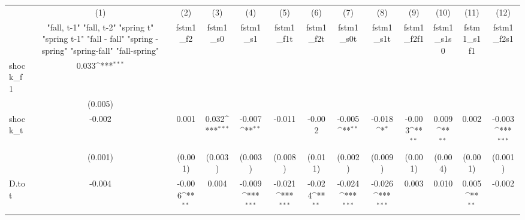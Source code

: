 {
\def\sym#1{\ifmmode^{#1}\else\(^{#1}\)\fi}
\begin{tabular}{l*{12}{c}}
\toprule
            &\multicolumn{1}{c}{(1)}&\multicolumn{1}{c}{(2)}&\multicolumn{1}{c}{(3)}&\multicolumn{1}{c}{(4)}&\multicolumn{1}{c}{(5)}&\multicolumn{1}{c}{(6)}&\multicolumn{1}{c}{(7)}&\multicolumn{1}{c}{(8)}&\multicolumn{1}{c}{(9)}&\multicolumn{1}{c}{(10)}&\multicolumn{1}{c}{(11)}&\multicolumn{1}{c}{(12)}\\
            &\multicolumn{1}{c}{  "fall, t-1" "fall, t-2" "spring t" "spring t-1"  "fall - fall" "spring - spring" "spring-fall" "fall-spring" }&\multicolumn{1}{c}{fstm1\_f2}&\multicolumn{1}{c}{fstm1\_s0}&\multicolumn{1}{c}{fstm1\_s1}&\multicolumn{1}{c}{fstm1\_f1t}&\multicolumn{1}{c}{fstm1\_f2t}&\multicolumn{1}{c}{fstm1\_s0t}&\multicolumn{1}{c}{fstm1\_s1t}&\multicolumn{1}{c}{fstm1\_f2f1}&\multicolumn{1}{c}{fstm1\_s1s0}&\multicolumn{1}{c}{fstm1\_s1f1}&\multicolumn{1}{c}{fstm1\_f2s1}\\
\midrule
shock\_f1    &       0.033\sym{***}&                     &                     &                     &                     &                     &                     &                     &                     &                     &                     &                     \\
            &     (0.005)         &                     &                     &                     &                     &                     &                     &                     &                     &                     &                     &                     \\
\addlinespace
shock\_t     &      -0.002         &       0.001         &       0.032\sym{***}&      -0.007\sym{**} &      -0.011         &      -0.002         &      -0.005\sym{**} &      -0.018\sym{*}  &      -0.003\sym{**} &       0.009\sym{**} &       0.002         &      -0.003\sym{***}\\
            &     (0.001)         &     (0.001)         &     (0.003)         &     (0.003)         &     (0.008)         &     (0.011)         &     (0.002)         &     (0.009)         &     (0.001)         &     (0.004)         &     (0.001)         &     (0.001)         \\
\addlinespace
D.tot       &      -0.004         &      -0.006\sym{**} &       0.004         &      -0.009\sym{***}&      -0.021\sym{***}&      -0.024\sym{**} &      -0.024\sym{***}&      -0.026\sym{***}&       0.003         &       0.010         &       0.005\sym{**} &      -0.002         \\

\end{tabular}}
